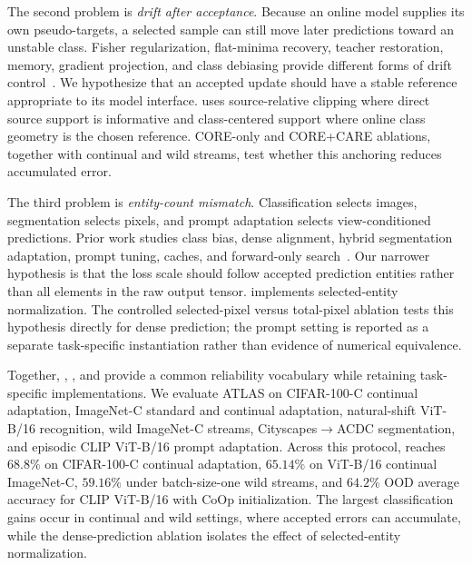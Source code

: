 The second problem is \emph{drift after acceptance}. Because an online model supplies its own pseudo-targets, a selected sample can still move later predictions toward an unstable class. Fisher regularization, flat-minima recovery, teacher restoration, memory, gradient projection, and class debiasing provide different forms of drift control~\citep{niu2022eata,niu2023sar,wang2022cotta,yuan2023rotta,duan2025lifelong,ma2025adadem}. We hypothesize that an accepted update should have a stable reference appropriate to its model interface. \care{} uses source-relative clipping where direct source support is informative and class-centered support where online class geometry is the chosen reference. CORE-only and CORE+CARE ablations, together with continual and wild streams, test whether this anchoring reduces accumulated error.

The third problem is \emph{entity-count mismatch}. Classification selects images, segmentation selects pixels, and prompt adaptation selects view-conditioned predictions. Prior work studies class bias, dense alignment, hybrid segmentation adaptation, prompt tuning, caches, and forward-only search~\citep{ma2025adadem,jeon2025exploiting,de2025test,you2025test,park2025hybrid,shu2022tpt,ma2023swapprompt,feng2025diffusion,farina2024zero,karmanov2024tda,dai2025freetta,niu2024foa}. Our narrower hypothesis is that the loss scale should follow accepted prediction entities rather than all elements in the raw output tensor. \sane{} implements selected-entity normalization. The controlled selected-pixel versus total-pixel ablation tests this hypothesis directly for dense prediction; the prompt setting is reported as a separate task-specific instantiation rather than evidence of numerical equivalence.

Together, \core{}, \care{}, and \sane{} provide a common reliability vocabulary while retaining task-specific implementations. We evaluate ATLAS on CIFAR-100-C continual adaptation, ImageNet-C standard and continual adaptation, natural-shift ViT-B/16 recognition, wild ImageNet-C streams, Cityscapes$\rightarrow$ACDC segmentation, and episodic CLIP ViT-B/16 prompt adaptation. Across this protocol, \method{} reaches $68.8\%$ on CIFAR-100-C continual adaptation, $65.14\%$ on ViT-B/16 continual ImageNet-C, $59.16\%$ under batch-size-one wild streams, and $64.2\%$ OOD average accuracy for CLIP ViT-B/16 with CoOp initialization. The largest classification gains occur in continual and wild settings, where accepted errors can accumulate, while the dense-prediction ablation isolates the effect of selected-entity normalization.

